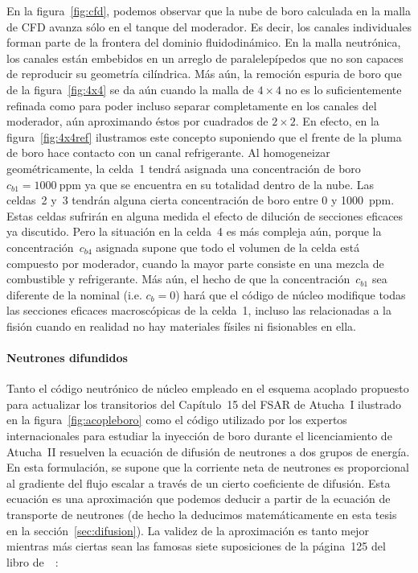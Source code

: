 En la figura~\ref{fig:cfd}, podemos observar que la nube de boro calculada en la malla de CFD avanza sólo en el tanque del moderador. Es decir, los canales individuales forman parte de la frontera del dominio fluidodinámico. En la malla neutrónica, los canales están embebidos en un arreglo de paralelepípedos que no son capaces de reproducir su geometría cilíndrica. Más aún, la remoción espuria de boro que de la figura~\ref{fig:4x4} se da aún cuando la malla de $4 \times 4$ no es lo suficientemente refinada como para poder incluso separar completamente en  los canales del moderador, aún aproximando éstos por cuadrados de $2 \times 2$. En efecto, en la figura~\ref{fig:4x4ref} ilustramos este concepto suponiendo que el frente de la pluma de boro hace contacto con un canal refrigerante. Al homogeneizar geométricamente, la celda~1 tendrá asignada una concentración de boro~$c_{b1} = 1000~\text{ppm}$ ya que se encuentra en su totalidad dentro de la nube. Las celdas~2 y~3 tendrán alguna cierta concentración de boro 
entre 0 y 1000~ppm. Estas celdas sufrirán en alguna medida el efecto de dilución de secciones eficaces ya discutido. Pero la situación en la celda~4 es más compleja aún, porque la concentración~$c_{b4}$ asignada supone que todo el volumen de la celda está compuesto por moderador, cuando la mayor parte consiste en una mezcla de combustible y refrigerante. Más aún, el hecho de que la concentración~$c_{b1}$ sea diferente de la nominal (i.e. $c_b=0$) hará que el código de núcleo modifique todas las secciones eficaces macroscópicas de la celda~1, incluso las relacionadas a la fisión cuando en realidad no hay materiales físiles ni fisionables en ella.

\paragraph{Neutrones difundidos} Tanto el código neutrónico de núcleo empleado en el esquema acoplado propuesto para actualizar los transitorios del Capítulo~15 del FSAR de Atucha~I ilustrado en la figura~\ref{fig:acopleboro} como el código utilizado por los expertos internacionales para estudiar la inyección de boro durante el licenciamiento de Atucha~II resuelven la ecuación de difusión de neutrones a dos grupos de energía. En esta formulación, se supone que la corriente neta de neutrones es proporcional al gradiente del flujo escalar a través de un cierto coeficiente de difusión. Esta ecuación es una aproximación que podemos deducir a partir de la ecuación de transporte de neutrones (de hecho la deducimos matemáticamente en esta tesis en la sección~\ref{sec:difusion}). La validez de la aproximación es tanto mejor mientras más ciertas sean las famosas siete suposiciones de la página~125 del libro de~\citeauthor{lamarsh}~\cite{lamarsh}:

